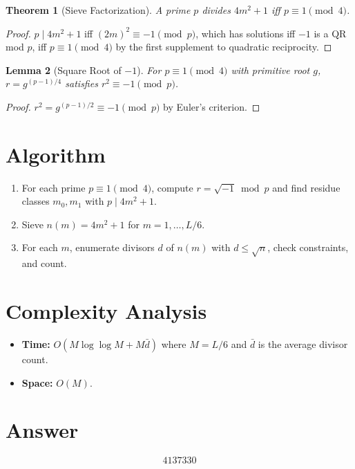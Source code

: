 \documentclass[12pt]{article}
\newtheorem{theorem}{Theorem}
\newtheorem{lemma}[theorem]{Lemma}
\begin{document}
\begin{theorem}[Sieve Factorization]
A prime $p$ divides $4m^2 + 1$ iff $p \equiv 1 \pmod{4}$.
\end{theorem}
\begin{proof}
$p \mid 4m^2 + 1$ iff $(2m)^2 \equiv -1 \pmod{p}$, which has solutions iff $-1$ is a QR mod $p$, iff $p \equiv 1 \pmod{4}$ by the first supplement to quadratic reciprocity.
\end{proof}

\begin{lemma}[Square Root of $-1$]
For $p \equiv 1 \pmod{4}$ with primitive root $g$, $r = g^{(p-1)/4}$ satisfies $r^2 \equiv -1 \pmod{p}$.
\end{lemma}
\begin{proof}
$r^2 = g^{(p-1)/2} \equiv -1 \pmod{p}$ by Euler's criterion.
\end{proof}

\section{Algorithm}
\begin{enumerate}
\item For each prime $p \equiv 1 \pmod{4}$, compute $r = \sqrt{-1} \bmod p$ and find residue classes $m_0, m_1$ with $p \mid 4m^2+1$.
\item Sieve $n(m) = 4m^2 + 1$ for $m = 1, \ldots, L/6$.
\item For each $m$, enumerate divisors $d$ of $n(m)$ with $d \leq \sqrt{n}$, check constraints, and count.
\end{enumerate}

\section{Complexity Analysis}
\begin{itemize}
\item \textbf{Time:} $O(M \log\log M + M\bar{d})$ where $M = L/6$ and $\bar{d}$ is the average divisor count.
\item \textbf{Space:} $O(M)$.
\end{itemize}

\section{Answer}

\[
\boxed{4137330}
\]
\end{document}
